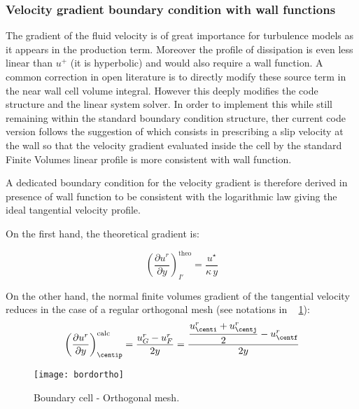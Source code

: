 \subsubsection{Velocity gradient boundary condition with wall functions}
The gradient of the fluid velocity is of great importance for turbulence models
as it appears in the production term.
Moreover the profile of dissipation is even less linear than $u^+$ (it is
hyperbolic) and would also require a wall function. A common correction in open literature is
to directly modify these source term in the near wall cell volume integral. However this deeply
modifies the code structure and the linear system solver. In order to implement this while still
remaining within the standard boundary condition structure, ther current code version follows
the suggestion of \cite{BouckerMattei:2000} which consists in prescribing a slip velocity at the wall so
that the velocity gradient evaluated inside the cell by the
standard Finite Volumes linear profile is more consistent with wall
function.

A dedicated boundary condition for the velocity gradient is therefore derived
in presence of wall function to be consistent with the logarithmic law giving
the ideal tangential velocity profile.

On the first hand, the theoretical gradient is:

\begin{equation}\label{eq:bndcnd:vel_grad_wallf_theo}
\left( \dfrac{\partial u^r}{\partial y}\right)_{I'}^\textrm{theo} =\dfrac{u^\star}{\kappa \, y}
\end{equation}

On the other hand,
the normal finite volumes gradient of the tangential velocity reduces in the case
of a regular orthogonal mesh  (see notations in \figurename~
\ref{fig:bndcnd:boundary_cell_ortho_mesh}):
\begin{equation}\label{eq:bndcnd:vel_grad_wallf_calc}
\left( \dfrac{\partial u^r}{\partial y}\right)_{\centip}^\textrm{calc} = \dfrac{u_{G}^r - u_{F}^r}{2y} =
 \dfrac{\dfrac{u_{\centi}^r+u_{\centj}^r}{2} -  u_{\centf}^r}{2y}
\end{equation}

\begin{figure}[!htbp]
\centering
\texttt{[image: bordortho]}
\caption{\label{fig:bndcnd:boundary_cell_ortho_mesh}Boundary cell - Orthogonal mesh.}
\end{figure}

